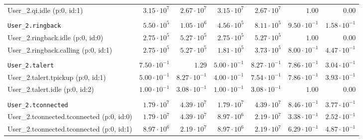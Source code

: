 \begin{table}[htbp]
{\begin{tabular}{lrrrrrr}
\hspace{3mm}User\_2.qi.idle (p:0, id:1)               &  $3.15 \cdot 10^{7}$ &  $2.67 \cdot 10^{7}$ &  $3.15 \cdot 10^{7}$ &  $2.67 \cdot 10^{7}$ &               $1.00$ &               $0.00$ \\
\\[-8pt]\texttt{User\_2.ringback}                     &  $5.50 \cdot 10^{5}$ &  $1.05 \cdot 10^{6}$ &  $4.56 \cdot 10^{5}$ &  $8.11 \cdot 10^{5}$ & $9.50 \cdot 10^{-1}$ & $1.58 \cdot 10^{-1}$ \\
\hspace{3mm}User\_2.ringback.idle (p:0, id:0)         &  $2.75 \cdot 10^{5}$ &  $5.27 \cdot 10^{5}$ &  $2.75 \cdot 10^{5}$ &  $5.27 \cdot 10^{5}$ &               $1.00$ &               $0.00$ \\
\hspace{3mm}User\_2.ringback.calling (p:0, id:1)      &  $2.75 \cdot 10^{5}$ &  $5.27 \cdot 10^{5}$ &  $1.81 \cdot 10^{5}$ &  $3.73 \cdot 10^{5}$ & $8.00 \cdot 10^{-1}$ & $4.47 \cdot 10^{-1}$ \\
\\[-8pt]\texttt{User\_2.talert}                       & $7.50 \cdot 10^{-1}$ &               $1.29$ & $5.00 \cdot 10^{-1}$ & $8.27 \cdot 10^{-1}$ & $7.86 \cdot 10^{-1}$ & $3.04 \cdot 10^{-1}$ \\
\hspace{3mm}User\_2.talert.tpickup (p:0, id:1)        & $5.00 \cdot 10^{-1}$ & $8.27 \cdot 10^{-1}$ & $4.00 \cdot 10^{-1}$ & $7.54 \cdot 10^{-1}$ & $7.86 \cdot 10^{-1}$ & $3.93 \cdot 10^{-1}$ \\
\hspace{3mm}User\_2.talert.idle (p:0, id:2)           & $1.00 \cdot 10^{-1}$ & $3.08 \cdot 10^{-1}$ & $1.00 \cdot 10^{-1}$ & $3.08 \cdot 10^{-1}$ &               $1.00$ &               $0.00$ \\
\\[-8pt]\texttt{User\_2.tconnected}                   &  $1.79 \cdot 10^{7}$ &  $4.39 \cdot 10^{7}$ &  $1.79 \cdot 10^{7}$ &  $4.39 \cdot 10^{7}$ & $8.46 \cdot 10^{-1}$ & $3.77 \cdot 10^{-1}$ \\
\hspace{3mm}User\_2.tconnected.tconnected (p:0, id:0) &  $1.79 \cdot 10^{7}$ &  $4.39 \cdot 10^{7}$ &  $8.97 \cdot 10^{6}$ &  $2.19 \cdot 10^{7}$ & $3.38 \cdot 10^{-1}$ & $2.52 \cdot 10^{-1}$ \\
\hspace{3mm}User\_2.tconnected.tconnected (p:0, id:1) &  $8.97 \cdot 10^{6}$ &  $2.19 \cdot 10^{7}$ &  $8.97 \cdot 10^{6}$ &  $2.19 \cdot 10^{7}$ & $6.29 \cdot 10^{-1}$ & $4.87 \cdot 10^{-1}$ \\

\end{tabular}}
\end{table}
